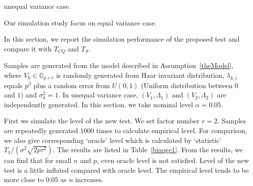 \documentclass[review]{elsarticle}
\theoremstyle{plain}
\theoremstyle{definition}
\theoremstyle{remark}
\begin{document}
{\color{red} unequal variance case.}

Our simulation study focus on equal variance case. 

In this section, we report the simulation performance of the proposed test and compare it with $T_{CQ}$ and $T_S$.


Samples are generated from the model described in Assumption~\ref{theModel},   
    where $V_k\in\mathbb{O}_{p\times r}$ is randomly generated from Haar invariant distribution, $\lambda_{k,i}$ equals $p^{\beta}$ plus a random error from $U(0,1)$ (Uniform distribution between $0$ and $1$) and $\sigma^2_k=1$.
    In unequal variance case, $(V_1,\Lambda_1)$ and $(V_2,\Lambda_2)$ are independently generated.
In this section, we take nominal level $\alpha=0.05$.


First we simulate the level of the new test. We set factor number $r=2$.
Samples are repeatedly generated $1000$ times to calculate empirical level.
For comparison, we also give corresponding `oracle' level which is calculated by `statistic' ${T_1}/(\sigma^2\sqrt{2p\tau^2})$.
The results are listed in
Table~\ref{biaoge1}. From the results, we can find that for small $n$ and $p$, even oracle level is not satisfied.
Level of the new test is  a little inflated compared with oracle level. The empirical level tends to be more close to $0.05$ as $n$ increases.
\end{document}
